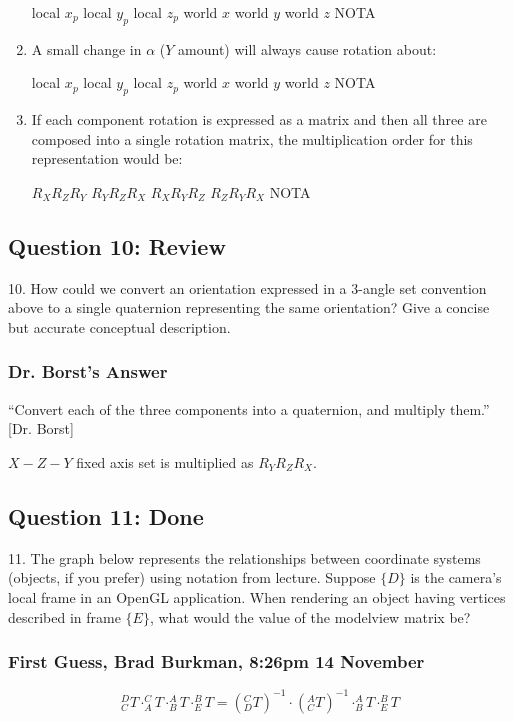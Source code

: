 \documentclass[11pt]{article}
\begin{document}
\begin{spacing}{1.2}
\begin{enumerate}[label=\arabic*)]
	local $x_p$ \qquad local $y_p$ \qquad local $z_p$ \qquad world $x$ \qquad world $y$ \qquad world $z$ \qquad NOTA
	
	\item A small change in $\alpha$ ($Y$ amount) will always cause rotation about:
	
	local $x_p$ \qquad local $y_p$ \qquad local $z_p$ \qquad world $x$ \qquad world $y$ \qquad world $z$ \qquad NOTA
	\item If each component rotation is expressed as a matrix and then all three are composed into a single rotation matrix, the multiplication order for this representation would be:
	
	$R_XR_ZR_Y$ \qquad
	$R_YR_ZR_X$ \qquad
	$R_XR_YR_Z$ \qquad
	$R_ZR_YR_X$ \qquad
	NOTA
\end{enumerate}

\subsection{Question 10:  Review}
10.  How could we convert an orientation expressed in a 3-angle set convention above to a single quaternion representing the same orientation?  Give a concise but accurate conceptual description.

\subsubsection{Dr. Borst's Answer}

``Convert each of the three components into a quaternion, and multiply them.'' [Dr. Borst]

$X-Z-Y$ fixed axis set is multiplied as $R_YR_ZR_X$.


\subsection{Question 11:  Done}
11.  The graph below represents the relationships between coordinate systems (objects, if you prefer) using notation from lecture.  Suppose $\{D\}$ is the camera's local frame in an OpenGL application.  When rendering an object having vertices described in frame $\{E\}$, what would the value of the modelview matrix be?

\subsubsection{First Guess, Brad Burkman, 8:26pm 14 November}

$$
	^D_CT \cdot 
	^C_AT \cdot 
	^A_BT \cdot 
	^B_ET = 
	\left( ^C_DT \right)^{-1} \cdot
	\left( ^A_CT \right)^{-1} \cdot
	^A_BT \cdot 
	^B_ET
	$$
	

\end{spacing}
\end{document}
